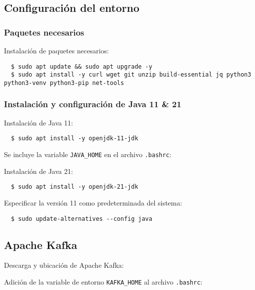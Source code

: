 \documentclass{../../../miPlantilla}
\begin{document}
\subsection{Configuración del entorno}
\subsubsection*{Paquetes necesarios}
\label{anexo:paquetes-vm}

Instalación de paquetes necesarios:
\begin{lstlisting}
  $ sudo apt update && sudo apt upgrade -y
  $ sudo apt install -y curl wget git unzip build-essential jq python3 python3-venv python3-pip net-tools
\end{lstlisting}

\subsubsection*{Instalación y configuración de Java 11 \& 21}
\label{anexo:config-java}

Instalación de Java 11:
\begin{lstlisting}
  $ sudo apt install -y openjdk-11-jdk
\end{lstlisting}

Se incluye la variable \texttt{JAVA\_HOME} en el archivo \texttt{.bashrc}:

\newpage

Instalación de Java 21:
\begin{lstlisting}
  $ sudo apt install -y openjdk-21-jdk
\end{lstlisting}

Especificar la versión 11 como predeterminada del sistema:
\begin{lstlisting}
  $ sudo update-alternatives --config java
\end{lstlisting}

\subsection{Apache Kafka}
\label{anexo:kafka}

Descarga y ubicación de Apache Kafka:

Adición de la variable de entorno \texttt{KAFKA\_HOME} al archivo \texttt{.bashrc}:
\end{document}
